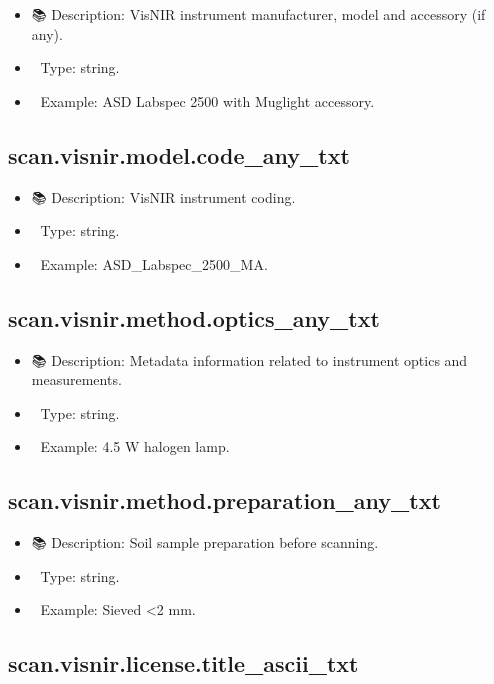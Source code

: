 \documentclass[
  letterpaper,
  DIV=11,
  numbers=noendperiod]{scrreprt}
\providecommand{\tightlist}{%
  \setlength{\itemsep}{0pt}\setlength{\parskip}{0pt}}\usepackage{longtable,booktabs,array}
\begin{document}
\begin{itemize}
\tightlist
\item
  📚 Description: VisNIR instrument manufacturer, model and accessory
  (if any).
\item
  🔢 Type: string.
\item
  📖 Example: ASD Labspec 2500 with Muglight accessory.
\end{itemize}

\subsection{scan.visnir.model.code\_any\_txt}\label{scan.visnir.model.code_any_txt}

\begin{itemize}
\tightlist
\item
  📚 Description: VisNIR instrument coding.
\item
  🔢 Type: string.
\item
  📖 Example: ASD\_Labspec\_2500\_MA.
\end{itemize}

\subsection{scan.visnir.method.optics\_any\_txt}\label{scan.visnir.method.optics_any_txt}

\begin{itemize}
\tightlist
\item
  📚 Description: Metadata information related to instrument optics and
  measurements.
\item
  🔢 Type: string.
\item
  📖 Example: 4.5 W halogen lamp.
\end{itemize}

\subsection{scan.visnir.method.preparation\_any\_txt}\label{scan.visnir.method.preparation_any_txt}

\begin{itemize}
\tightlist
\item
  📚 Description: Soil sample preparation before scanning.
\item
  🔢 Type: string.
\item
  📖 Example: Sieved \textless2 mm.
\end{itemize}

\subsection{scan.visnir.license.title\_ascii\_txt}\label{scan.visnir.license.title_ascii_txt}
\end{document}
